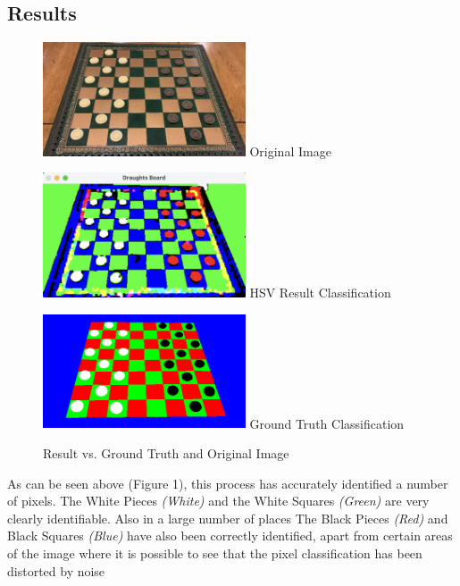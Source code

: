\documentclass[11pt]{article}
\begin{document}
    \subsection{Results}
    \begin{figure}
        \begin{minipage}[c]{0.4\linewidth}
            \centering
            \includegraphics[width=6cm]{DraughtsGame1Move0.png}
            Original Image
        \end{minipage}\hfill
        \begin{minipage}[c]{0.4\linewidth}
            \centering
            \includegraphics[width=6cm]{HSV-Combined-Image.png}
            HSV Result Classification
        \end{minipage}\hfill
        \begin{minipage}[c]{0.4\linewidth}
            \centering
            \includegraphics[width=6cm]{DraughtsGame1Move0GroundTruth.png}
            Ground Truth Classification
        \end{minipage}
        \caption{Result vs. Ground Truth and Original Image}
    \end{figure}
    \par
    As can be seen above (Figure 1), this process has accurately identified a number of pixels. The White Pieces \emph{(White)} and the White Squares \emph{(Green)} are very clearly identifiable. Also in a large number of places
    The Black Pieces \emph{(Red)} and Black Squares \emph{(Blue)} have also been correctly identified, apart from certain areas of the image where it is possible to see that the pixel classification has been distorted by noise 
\end{document}
